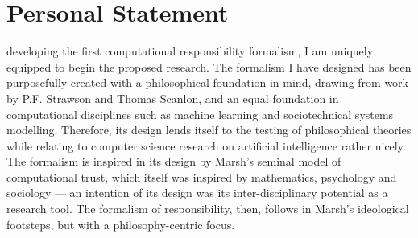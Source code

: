 \newpage

\section{Personal Statement}

 developing the first computational responsibility formalism, I am uniquely equipped to begin the proposed research. The formalism I have designed has been purposefully created with a philosophical foundation in mind, drawing from work by P.F. Strawson\cite{freedomandresentment} and Thomas Scanlon\cite{scanlon2006justice}, and an equal foundation in computational disciplines such as machine learning and sociotechnical systems modelling\cite{sommerville_resp_depend}. Therefore, its design lends itself to the testing of philosophical theories while relating to computer science research on artificial intelligence rather nicely. The formalism is inspired in its design by Marsh's seminal model of computational trust\cite{marsh1994}, which itself was inspired by mathematics, psychology and sociology --- an intention of its design was its inter-disciplinary potential as a research tool. The formalism of responsibility, then, follows in Marsh's ideological footsteps, but with a philosophy-centric focus.\par

